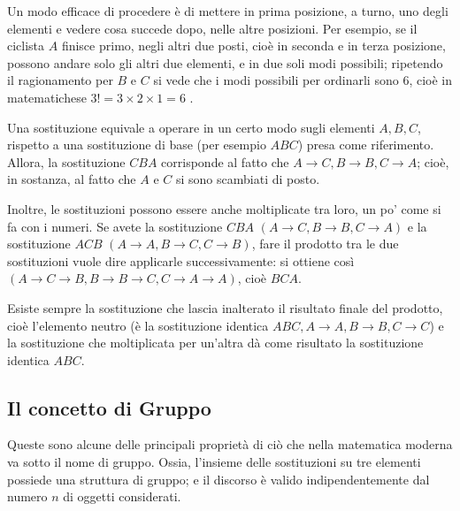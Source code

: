 Un modo efficace di procedere è di mettere in prima posizione, a turno, uno degli elementi e vedere cosa succede dopo, nelle altre posizioni. Per esempio, se il ciclista $ A $ finisce primo, negli altri due posti, cioè in seconda e in terza posizione, possono andare solo gli altri due elementi, e in due soli modi possibili; ripetendo il ragionamento per $ B $ e $ C $ si vede che i modi possibili per ordinarli sono $ 6 $, cioè in matematichese $ 3! = 3\times 2\times 1 =6 $ .

Una sostituzione equivale a operare in un certo modo sugli elementi $ A, B, C $, rispetto a una sostituzione di base (per esempio $ ABC $) presa come riferimento. Allora, la sostituzione $ CBA $ corrisponde al fatto che $ A\to C, B\to B, C\to A $; cioè, in sostanza, al fatto che $ A $ e $ C $ si sono scambiati di posto.

Inoltre, le sostituzioni possono essere anche moltiplicate tra loro, un po’ come si fa con i numeri. Se avete la sostituzione $ CBA $ $ (A\to C, B\to B, C\to A) $ e la sostituzione $ ACB $ $ (A\to A, B \to C, C\to B) $, fare il prodotto tra le due sostituzioni vuole dire applicarle successivamente: si ottiene così $ (A\to C\to B, B\to B\to C, C\to A\to A) $, cioè $ BCA $.

Esiste sempre la sostituzione che lascia inalterato il risultato finale del prodotto, cioè l’elemento neutro (è la sostituzione identica $ ABC, A\to A, B\to B, C\to C $) e la sostituzione che moltiplicata per un’altra dà come risultato la sostituzione identica $ ABC $.
\subsection{Il concetto di Gruppo}

Queste sono alcune delle principali proprietà di ciò che nella matematica moderna va sotto il nome di gruppo. Ossia, l’insieme delle sostituzioni su tre elementi possiede una struttura di gruppo; e il discorso è valido indipendentemente dal numero $ n $ di oggetti considerati.


